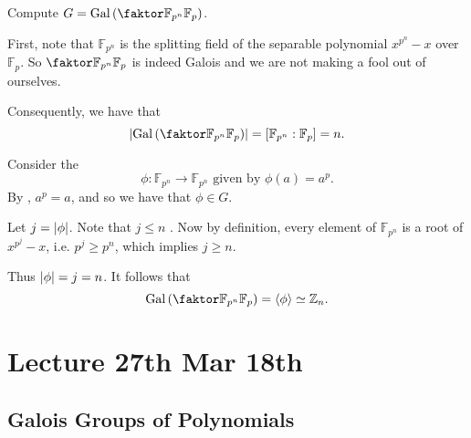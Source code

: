 \documentclass[notoc,notitlepage,nobib]{tufte-book}
\DeclareMathOperator{\Gal}{Gal}
\begin{document}
\begin{eg}
  Compute $G = \Gal \left( \quotient{\mathbb{F}_{p^n}}{\mathbb{F}_p} \right)$.

  \begin{solution}
    First, note that $\mathbb{F}_{p^n}$ is the splitting field of the separable
    polynomial $x^{p^n} - x$ over $\mathbb{F}_{p}$. So
    $\quotient{\mathbb{F}_{p^n}}{\mathbb{F}_p}$ is indeed Galois and we are not
    making a fool out of ourselves.

    Consequently, we have that
    \begin{equation*}
      \abs{\Gal \left( \quotient{\mathbb{F}_{p^n}}{\mathbb{F}_p} \right)}
      = [ \mathbb{F}_{p^n} : \mathbb{F}_p ] = n.
    \end{equation*}

    Consider the 
    \begin{equation*}
      \phi : \mathbb{F}_{p^n} \to \mathbb{F}_{p^n} \text{ given by } \phi(a) = a^p.
    \end{equation*}
    By , $a^p = a$, and so we have that $\phi
    \in G$.

    Let $j = \left|\phi\right|$. Note that $j \leq n$ . Now by
    definition, every element of $\mathbb{F}_{p^n}$ is a root of $x^{p^j} - x$,
    i.e. $p^j \geq p^n$, which implies $j \geq n$.

    Thus $\left|\phi\right| = j = n$. It follows that
    \begin{equation*}
      \Gal \left( \quotient{\mathbb{F}_{p^n}}{\mathbb{F}_p} \right) = \langle
      \phi \rangle \simeq \mathbb{Z}_n.
    \end{equation*}
  \end{solution}
\end{eg}



\chapter{Lecture 27th Mar 18th}%
\label{chp:lecture_27th_mar_18th}

\section{Galois Groups of Polynomials}%
\label{sec:galois_groups_of_polynomials}
\end{document}
